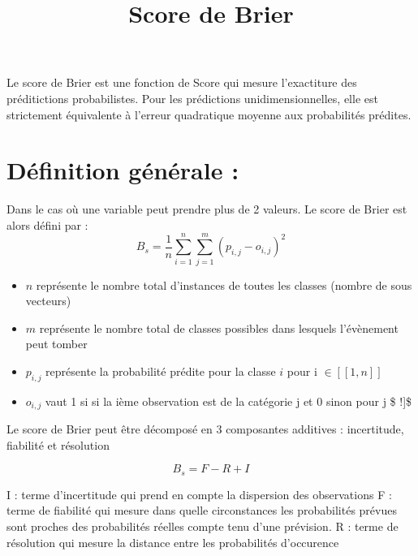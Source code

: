 \documentclass[
  letterpaper,
  DIV=11,
  numbers=noendperiod]{scrartcl}
\title{Score de Brier}
\author{}
\date{}
\providecommand{\tightlist}{%
  \setlength{\itemsep}{0pt}\setlength{\parskip}{0pt}}\usepackage{longtable,booktabs,array}
\begin{document}
\maketitle
\ifdefined\Shaded\renewenvironment{Shaded}{\begin{tcolorbox}[interior hidden, breakable, borderline west={3pt}{0pt}{shadecolor}, enhanced, frame hidden, boxrule=0pt, sharp corners]}{\end{tcolorbox}}\fi

Le score de Brier est une fonction de Score qui mesure l'exactiture des
préditictions probabilistes. Pour les prédictions unidimensionnelles,
elle est strictement équivalente à l'erreur quadratique moyenne aux
probabilités prédites.

\hypertarget{duxe9finition-guxe9nuxe9rale}{%
\section{Définition générale :}\label{duxe9finition-guxe9nuxe9rale}}

Dans le cas où une variable peut prendre plus de 2 valeurs. Le score de
Brier est alors défini par : \[
B_s = \frac{1}{n}\sum_{i=1}^{n}\sum_{j=1}^{m}(p_{i,j} - o_{i,j})^2
\]

\begin{itemize}
\tightlist
\item
  \(n\) représente le nombre total d'instances de toutes les classes
  (nombre de sous vecteurs)
\item
  \(m\) représente le nombre total de classes possibles dans lesquels
  l'évènement peut tomber
\item
  \(p_{i,j}\) représente la probabilité prédite pour la classe \(i\)
  pour i \(\in [\![1,n]\!]\)
\item
  \(o_{i,j}\) vaut 1 si si la ième observation est de la catégorie j et
  0 sinon pour j \$ \in [\![1,m]!{]}\$
\end{itemize}

Le score de Brier peut être décomposé en 3 composantes additives :
incertitude, fiabilité et résolution

\[
B_s = F - R + I 
\]

I : terme d'incertitude qui prend en compte la dispersion des
observations F : terme de fiabilité qui mesure dans quelle circonstances
les probabilités prévues sont proches des probabilités réelles compte
tenu d'une prévision. R : terme de résolution qui mesure la distance
entre les probabilités d'occurence
\end{document}
